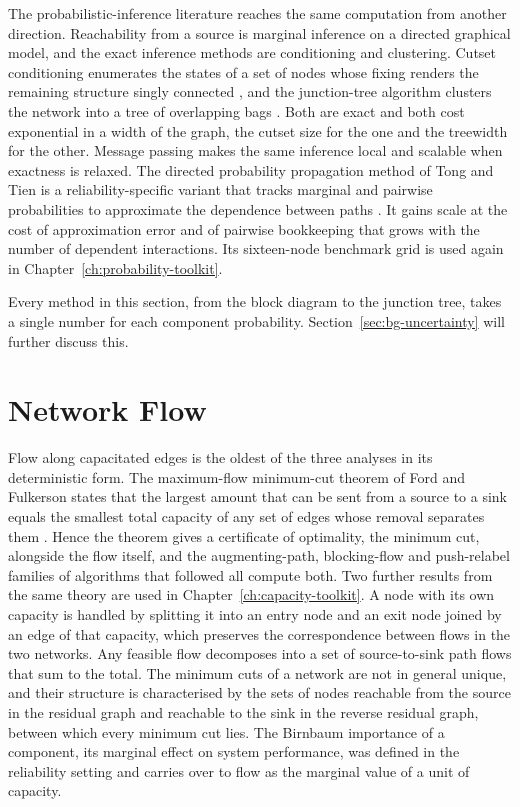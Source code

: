 \documentclass[12pt]{report}
\begin{document}
The probabilistic-inference literature reaches the same computation from another direction.
Reachability from a source is marginal inference on a directed graphical model, and the exact
inference methods are conditioning and clustering. Cutset conditioning enumerates the states of
a set of nodes whose fixing renders the remaining structure singly connected
\cite{pearl1988probabilistic}, and the junction-tree algorithm clusters the network into a tree
of overlapping bags \cite{lauritzen1988local}. Both are exact and both cost exponential in a
width of the graph, the cutset size for the one and the treewidth for the other. Message
passing makes the same inference local and scalable when exactness is relaxed. The directed
probability propagation method of Tong and Tien is a reliability-specific variant that tracks
marginal and pairwise probabilities to approximate the dependence between paths
\cite{tong2019directed}. It gains scale at the cost of approximation error and of pairwise
bookkeeping that grows with the number of dependent interactions. Its sixteen-node benchmark
grid is used again in Chapter~\ref{ch:probability-toolkit}.

Every method in this section, from the block diagram to the junction tree, takes a single
number for each component probability. Section~\ref{sec:bg-uncertainty} will further discuss
this.

\section{Network Flow}
\label{sec:bg-flow}

Flow along capacitated edges is the oldest of the three analyses in its deterministic form.
The maximum-flow minimum-cut theorem of Ford and Fulkerson states that the largest amount that
can be sent from a source to a sink equals the smallest total capacity of any set of edges
whose removal separates them \cite{ford1956,ford1962}. Hence the theorem gives a certificate of optimality, the minimum cut, alongside the flow
itself, and the augmenting-path, blocking-flow and push-relabel families of algorithms that
followed all compute both. Two further results
from the same theory are used in Chapter~\ref{ch:capacity-toolkit}. A node with its own
capacity is handled by splitting it into an entry node and an exit node joined by an edge of
that capacity, which preserves the correspondence between flows in the two networks. Any
feasible flow decomposes into a set of source-to-sink path flows that sum to the total. The
minimum cuts of a network are not in general unique, and their structure is characterised by
the sets of nodes reachable from the source in the residual graph and reachable to the sink in
the reverse residual graph, between which every minimum cut lies. The Birnbaum importance of a
component, its marginal effect on system performance, was defined in the reliability setting
\cite{birnbaum1969} and carries over to flow as the marginal value of a unit of capacity.
\end{document}
